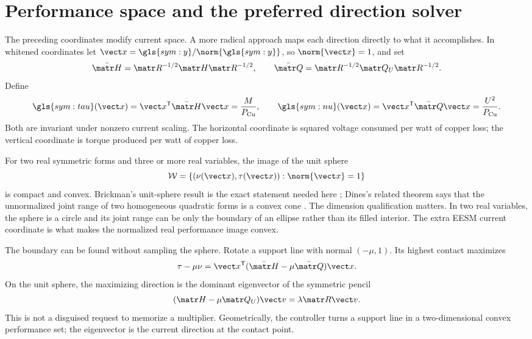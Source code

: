 \section{Performance space and the preferred direction solver}
\label{sec:performance}

The preceding coordinates modify current space. A more radical approach maps
each direction directly to what it accomplishes. In whitened coordinates let
\(\vect x=\gls{sym:y}/\norm{\gls{sym:y}}\), so \(\norm{\vect x}=1\), and set
\begin{equation}
 \bar{\matr H}=\matr R^{-1/2}\matr H\matr R^{-1/2},\qquad
 \bar{\matr Q}=\matr R^{-1/2}\matr Q_U\matr R^{-1/2}.
\end{equation}
Define
\begin{equation}
 \gls{sym:tau}(\vect x)=\vect x^{\mathsf T}\bar{\matr H}\vect x
 =\frac{M}{P_{\mathrm{Cu}}},\qquad
 \gls{sym:nu}(\vect x)=\vect x^{\mathsf T}\bar{\matr Q}\vect x
 =\frac{U^2}{P_{\mathrm{Cu}}}.
 \label{eq:performance-coordinates}
\end{equation}
Both are invariant under nonzero current scaling. The horizontal coordinate
is squared voltage consumed per watt of copper loss; the vertical coordinate
is torque produced per watt of copper loss.

For two real symmetric forms and three or more real variables, the image of
the unit sphere
\begin{equation}
 \mathcal W=\{(\nu(\vect x),\tau(\vect x)):\norm{\vect x}=1\}
 \label{eq:joint-range}
\end{equation}
is compact and convex. Brickman's unit-sphere result is the exact statement
needed here \cite{brickman1961}; Dines's related theorem says that the
unnormalized joint range of two homogeneous quadratic forms is a convex cone
\cite{dines1941}. The dimension qualification matters. In two real variables,
the sphere is a circle and its joint range can be only the boundary of an
ellipse rather than its filled interior. The extra EESM current coordinate is
what makes the normalized real performance image convex.



The boundary can be found without sampling the sphere. Rotate a support line
with normal \((-\mu,1)\). Its highest contact maximizes
\begin{equation}
 \tau-\mu\nu
 =\vect x^{\mathsf T}(\bar{\matr H}-\mu\bar{\matr Q})\vect x.
\end{equation}
On the unit sphere, the maximizing direction is the dominant eigenvector of
the symmetric pencil
\begin{equation}
 (\matr H-\mu\matr Q_U)\vect v
 =\lambda\matr R\vect v.
 \label{eq:support-pencil}
\end{equation}
This is not a disguised request to memorize a multiplier. Geometrically, the
controller turns a support line in a two-dimensional convex performance set;
the eigenvector is the current direction at the contact point.

